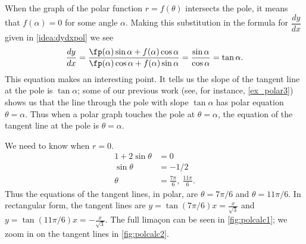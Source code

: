 When the graph of the polar function $r=f(\theta)$ intersects the pole, it means that $f(\alpha) = 0$ for some angle $\alpha$. Making this substitution in the formula for $\dfrac{dy}{dx}$ given in \autoref{idea:dydxpol} we see
\[
 \frac{dy}{dx}
 =\frac{\fp(\alpha)\sin\alpha+f(\alpha)\cos\alpha}{\fp(\alpha)\cos\alpha+f(\alpha)\sin\alpha}
 =\frac{\sin\alpha}{\cos\alpha}
 =\tan\alpha.
\]
%
This equation makes an interesting point. It tells us the slope of the tangent line at the pole is $\tan \alpha$; some of our previous work (see, for instance, \autoref{ex_polar3}) shows us that the line through the pole with slope $\tan \alpha$ has polar equation $\theta=\alpha$. Thus when a polar graph touches the pole at $\theta=\alpha$, the equation of the tangent line at the pole is $\theta=\alpha$.

{We need to know when $r=0$. 
\begin{align*}
1+2\sin\theta &= 0\\
\sin\theta &= -1/2\\
\theta &= \frac{7\pi}{6},\ \frac{11\pi}6.
\end{align*}
Thus the equations of the tangent lines, in polar, are $\theta = 7\pi/6$ and $\theta = 11\pi/6$. In rectangular form, the tangent lines are $y=\tan(7\pi/6)x=\frac x{\sqrt3}$ and $y=\tan(11\pi/6)x=-\frac x{\sqrt3}$. The full lima\c con can be seen in \autoref{fig:polcalc1}; we zoom in on the tangent lines in \autoref{fig:polcalc2}.}

